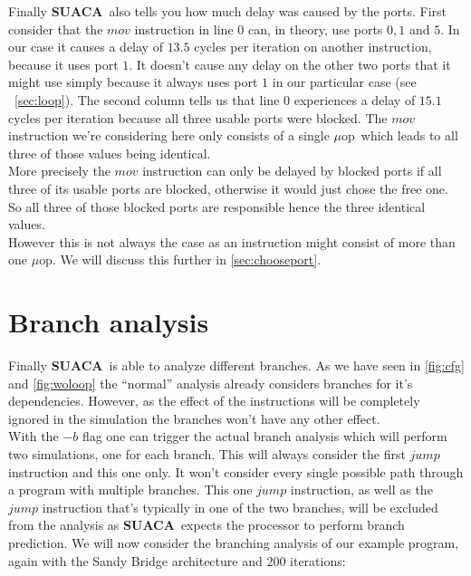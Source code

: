 \documentclass[a4paper,12pt,titlepage, twoside]{report}
\newcommand{\suaca}{\textbf{SUACA}}
\newcommand{\microop}{$\mu$op}
\begin{document}
Finally \suaca\ also tells you how much delay was caused by the ports. First consider that the $mov$ instruction in line $0$ can, in theory, use ports $0, 1$ and $5$. In our case it causes a delay of $13.5$ cycles per iteration on another instruction, because it uses port $1$. It doesn't cause any delay on the other two ports that it might use simply because it always uses port $1$ in our particular case (see ~\autoref{sec:loop}). The second column tells us that line $0$ experiences a delay of $15.1$ cycles per iteration because all three usable ports were blocked. The $mov$ instruction we're considering here only consists of a single \microop\ which leads to all three of those values being identical.\\
More precisely the $mov$ instruction can only be delayed by blocked ports if all three of its usable ports are blocked, otherwise it would just chose the free one. So all three of those blocked ports are responsible hence the three identical values.\\
However this is not always the case as an instruction might consist of more than one \microop. We will discuss this further in \autoref{sec:chooseport}.




\section{Branch analysis}

Finally \suaca\ is able to analyze different branches. As we have seen in \autoref{fig:cfg} and \autoref{fig:woloop} the ``normal'' analysis already considers branches for it's dependencies. However, as the effect of the instructions will be completely ignored in the simulation the branches won't have any other effect.\\
With the $-b$ flag one can trigger the actual branch analysis which will perform two simulations, one for each branch. This will always consider the first $jump$ instruction and this one only. It won't consider every single possible path through a program with multiple branches. This one $jump$ instruction, as well as the $jump$ instruction that's typically in one of the two branches, will be excluded from the analysis as \suaca\ expects the processor to perform branch prediction. We will now consider the branching analysis of our example program, again with the Sandy Bridge architecture and $200$ iterations:
\end{document}
